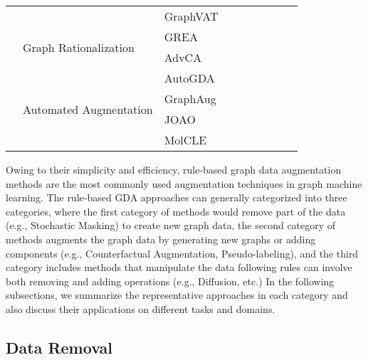 \documentclass[11pt]{article}
\newcommand{\cmark}{\ding{51}}%
\begin{document}
\begin{table}[!th]
\begin{tabular}{l|l|l|ccc|ccc}
& & GraphVAT~\cite{feng2019graph} &\cmark  &  &  & & \cmark  &  \\
\cmidrule(lr){2-9}
& \multirow{2}{*}{Graph Rationalization}
& GREA~\cite{liu2022graph} &  & \cmark &  & \cmark & \cmark &  \\
&& AdvCA~\cite{sui2022adversarial} &  & \cmark &  & \cmark & \cmark &  \\
\cmidrule(lr){2-9}
& \multirow{4}{*}{Automated Augmentation}
& AutoGDA~\cite{zhao2022autogda} & \cmark &  &  & \cmark & \cmark &  \\
& & GraphAug~\cite{luo2022automated} &  & \cmark &  & \cmark & \cmark &  \\
& & JOAO~\cite{you2021graph} &  & \cmark &  & \cmark & \cmark &  \\
& & MolCLE~\cite{wang2021molecular} &  & \cmark &  & \cmark & \cmark &  \\
\bottomrule
\end{tabular}
\end{table}

Owing to their simplicity and efficiency, rule-based graph data augmentation methods are the most commonly used augmentation techniques in graph machine learning. The rule-based GDA approaches can generally categorized into three categories, where the first category of methods would remove part of the data (e.g., Stochastic Masking) to create new graph data, the second category of methods augments the graph data by generating new graphs or adding components (e.g., Counterfactual Augmentation, Pseudo-labeling),
and the third category includes methods that manipulate the data following rules can involve both removing and adding operations (e.g., Diffusion, etc.) In the following subsections, we summarize the representative approaches in each category and also discuss their applications on different tasks and domains.

\subsection{Data Removal}
\label{sec:tong_dataremove}
\end{document}
